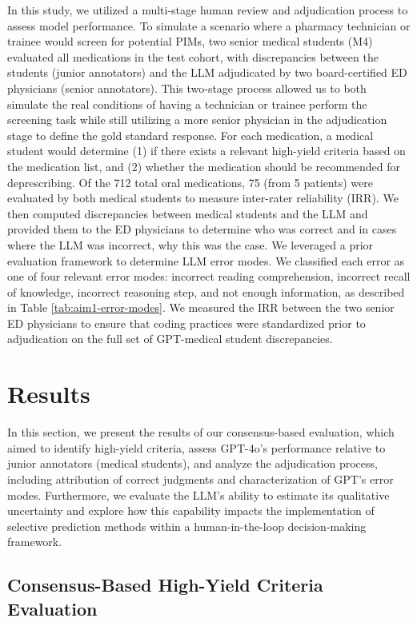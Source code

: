 In this study, we utilized a multi-stage human review and adjudication process to assess model performance. To simulate a scenario where a pharmacy technician or trainee would screen for potential PIMs, two senior medical students (M4) evaluated all medications in the test cohort, with discrepancies between the students (junior annotators) and the LLM adjudicated by two board-certified ED physicians (senior annotators). This two-stage process allowed us to both simulate the real conditions of having a technician or trainee perform the screening task while still utilizing a more senior physician in the adjudication stage to define the gold standard response. For each medication, a medical student would determine (1) if there exists a relevant high-yield criteria based on the medication list, and (2) whether the medication should be recommended for deprescribing. Of the 712 total oral medications, 75 (from 5 patients) were evaluated by both medical students to measure inter-rater reliability (IRR). We then computed discrepancies between medical students and the LLM and provided them to the ED physicians to determine who was correct and in cases where the LLM was incorrect, why this was the case. We leveraged a prior evaluation framework\citep{lievinCanLargeLanguage2024} to determine LLM error modes. We classified each error as one of four relevant error modes: incorrect reading comprehension, incorrect recall of knowledge, incorrect reasoning step, and not enough information, as described in Table \ref{tab:aim1-error-modes}. We measured the IRR between the two senior ED physicians to ensure that coding practices were standardized prior to adjudication on the full set of GPT-medical student discrepancies. 

\section{Results}

In this section, we present the results of our consensus-based evaluation, which aimed to identify high-yield criteria, assess GPT-4o's performance relative to junior annotators (medical students), and analyze the adjudication process, including attribution of correct judgments and characterization of GPT's error modes. Furthermore, we evaluate the LLM's ability to estimate its qualitative uncertainty and explore how this capability impacts the implementation of selective prediction methods within a human-in-the-loop decision-making framework. 

\subsection{Consensus-Based High-Yield Criteria Evaluation}

